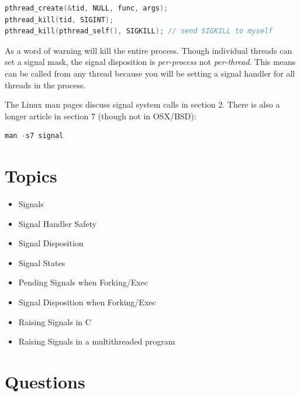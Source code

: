 \begin{lstlisting}[language=C]
pthread_create(&tid, NULL, func, args);
pthread_kill(tid, SIGINT);
pthread_kill(pthread_self(), SIGKILL); // send SIGKILL to myself
\end{lstlisting}

As a word of warning  will kill the entire process.
Though individual threads can set a signal mask, the signal disposition is \emph{per-process} not \emph{per-thread}.
This means  can be called from any thread because you will be setting a signal handler for all threads in the process.

The Linux man pages discuss signal system calls in section 2. There is also a longer article in section 7 (though not in OSX/BSD):

\begin{lstlisting}[language=C]
man -s7 signal
\end{lstlisting}

\section{Topics}

\begin{itemize}
\tightlist
\item
  Signals
\item
  Signal Handler Safety
\item
  Signal Disposition
\item
  Signal States
\item
  Pending Signals when Forking/Exec
\item
  Signal Disposition when Forking/Exec
\item
  Raising Signals in C
\item
  Raising Signals in a multithreaded program
\end{itemize}

\section{Questions}


